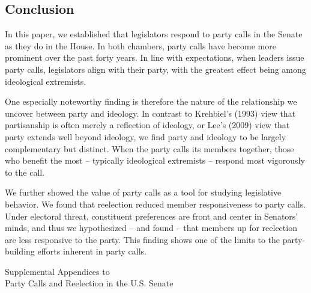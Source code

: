 \documentclass[12pt]{article}
\begin{document}
\subsection*{Conclusion}

In this paper, we established that legislators respond to party calls in the Senate as they do in the House. In both chambers, party calls have become more prominent over the past forty years.  In line with expectations, when leaders issue party calls, legislators align with their party, with the greatest effect being among ideological extremists.

One especially noteworthy finding is therefore the nature of the relationship we uncover between party and ideology.  In contrast to Krehbiel's (1993) view that partisanship is often merely a reflection of ideology, or Lee's (2009) view that party extends well beyond ideology, we find party and ideology to be largely complementary but distinct.  When the party calls its members together, those who benefit the most -- typically ideological extremists -- respond most vigorously to the call.

We further showed the value of party calls as a tool for studying legislative behavior.  We found that reelection reduced member responsiveness to party calls.  Under electoral threat, constituent preferences are front and center in Senators' minds, and thus we hypothesized -- and found -- that members up for reelection are less responsive to the party. This finding shows one of the limits to the party-building efforts inherent in party calls.

\clearpage



\clearpage

\setcounter{table}{0}
\setcounter{footnote}{0}
\setcounter{figure}{0}
\setcounter{page}{0}


\begin{center}
\vspace*{1in}
{\large Supplemental Appendices to\\}
{\Large Party Calls and Reelection in the U.S. Senate}
\end{center}
\vspace*{1in}

\thispagestyle{empty}


\setcounter{tocdepth}{1}
\setcounter{secnumdepth}{0}
\tableofcontents
\end{document}
